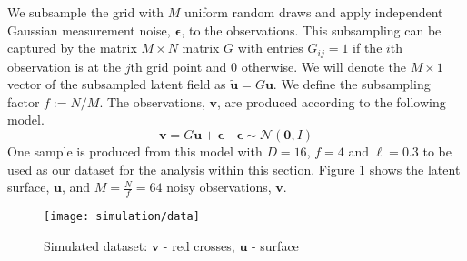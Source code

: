 \documentclass[11pt]{article}
\begin{document}
We subsample the grid with $M$ uniform random draws and apply independent Gaussian measurement noise, $\boldsymbol{\epsilon}$, to the observations. This subsampling can be captured by the matrix $M \times N$ matrix $G$ with entries $G_{ij} = 1$ if the $i$th observation is at the $j$th grid point and $0$ otherwise. We will denote the $M\times1$ vector of the subsampled latent field as $\tilde{\boldsymbol{u}} = G\boldsymbol{u}$. We define the subsampling factor $f := N/M$. The observations, $\boldsymbol{v}$, are produced according to the following model.
\begin{equation}
    \boldsymbol{v} = G\boldsymbol{u} + \boldsymbol{\epsilon} \quad \boldsymbol{\epsilon} \sim \mathcal{N}(\boldsymbol{0}, I)
\end{equation}
One sample is produced from this model with $D=16$, $f=4$ and $\ell=0.3$ to be used as our dataset for the analysis within this section. Figure \ref{fig:dataset} shows the latent surface, $\boldsymbol{u}$, and $M = \frac{N}{f} = 64$ noisy observations, $\boldsymbol{v}$. 

\begin{figure}
    \centering
    \texttt{[image: simulation/data]}
    \caption{Simulated dataset: $\boldsymbol{v}$ - red crosses, $\boldsymbol{u}$ - surface}
    \label{fig:dataset}
\end{figure}
\end{document}
